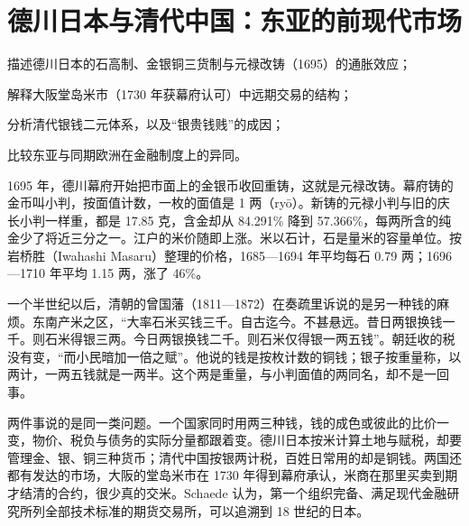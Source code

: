 \chapter{德川日本与清代中国：东亚的前现代市场}\label{ch:tokugawa}

\begin{chapterguide}
\begin{guidegoals}
\item 描述德川日本的石高制、金银铜三货制与元禄改铸（1695）的通胀效应；
\item 解释大阪堂岛米市（1730 年获幕府认可）中远期交易的结构；
\item 分析清代银钱二元体系，以及“银贵钱贱”的成因；
\item 比较东亚与同期欧洲在金融制度上的异同。
\end{guidegoals}
\end{chapterguide}

1695 年，德川幕府开始把市面上的金银币收回重铸，这就是元禄改铸。幕府铸的金币叫小判，按面值计数，一枚的面值是 1 两（ryō）。新铸的元禄小判与旧的庆长小判一样重，都是 17.85 克，含金却从 84.291\% 降到 57.366\%，每两所含的纯金少了将近三分之一\cite{suzuki2021}。江户的米价随即上涨。米以石计，石是量米的容量单位。按岩桥胜（Iwahashi Masaru）整理的价格，1685—1694 年平均每石 0.79 两；1696—1710 年平均 1.15 两，涨了 46\%\cite{iwahashi1981}。

一个半世纪以后，清朝的曾国藩（1811—1872）在奏疏里诉说的是另一种钱的麻烦。东南产米之区，“大率石米买钱三千。自古迄今。不甚悬远。昔日两银换钱一千。则石米得银三两。今日两银换钱二千。则石米仅得银一两五钱”。朝廷收的税没有变，“而小民暗加一倍之赋”\cite{xubiansheng}。他说的钱是按枚计数的铜钱；银子按重量称，以两计，一两五钱就是一两半。这个两是重量，与小判面值的两同名，却不是一回事。

两件事说的是同一类问题。一个国家同时用两三种钱，钱的成色或彼此的比价一变，物价、税负与债务的实际分量都跟着变。德川日本按米计算土地与赋税，却要管理金、银、铜三种货币；清代中国按银两计税，百姓日常用的却是铜钱。两国还都有发达的市场，大阪的堂岛米市在 1730 年得到幕府承认，米商在那里买卖到期才结清的合约，很少真的交米。Schaede 认为，第一个组织完备、满足现代金融研究所列全部技术标准的期货交易所，可以追溯到 18 世纪的日本\cite{schaede1989}。

